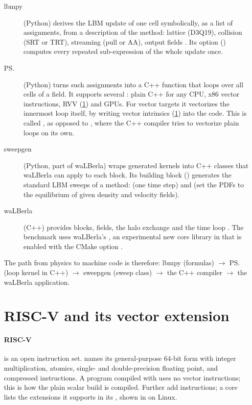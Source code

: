 \begin{description}
  \item[lbmpy] (Python) derives the LBM update of one cell symbolically, as a list of
        assignments, from a description of the method: lattice (D3Q19), collision (SRT or
        TRT), streaming (pull or AA), output fields \autocite{lbmpy}. Its option
         () computes every repeated
        sub-expression of the whole update once.
  \item[\ps{}] (Python) turns such assignments into a C++ function that loops over all cells
        of a field. It supports several : plain C++ for any
        CPU, x86 vector instructions, RVV (\cref{r03:sec:bg-rvv}) and GPUs. For vector targets
        it vectorizes the innermost loop itself, by writing vector intrinsics
        (\cref{r03:sec:bg-rvv}) into the code. This is called ,
        as opposed to , where the C++ compiler tries to vectorize
        plain loops on its own.
  \item[sweepgen] (Python, part of waLBerla) wraps generated kernels into C++ 
        classes that waLBerla can apply to each block. Its building block
        ()  generates the standard LBM sweeps of a method:
         (one time step) and  (set the PDFs to the
        equilibrium of given density and velocity fields).
  \item[waLBerla] (C++) provides blocks, fields, the halo exchange and the time loop
        \autocite{walberla}. The benchmark uses waLBerla's , an experimental
        new core library in  that is enabled with the CMake option
        .
\end{description}
The path from physics to machine code is therefore: lbmpy (formulas) $\rightarrow$ \ps{}
(loop kernel in C++) $\rightarrow$ sweepgen (sweep class) $\rightarrow$ the C++ compiler
$\rightarrow$ the waLBerla application.

\section{RISC-V and its vector extension}\label{r03:sec:bg-rvv}

\paragraph{RISC-V} is an open instruction set.  names its general-purpose 64-bit
form with integer multiplication, atomics, single- and double-precision floating point, and
compressed instructions. A program compiled with  uses no vector
instructions; this is how the plain scalar build is compiled. Further  add
instructions; a core lists the extensions it supports in its , shown in
 on Linux.

